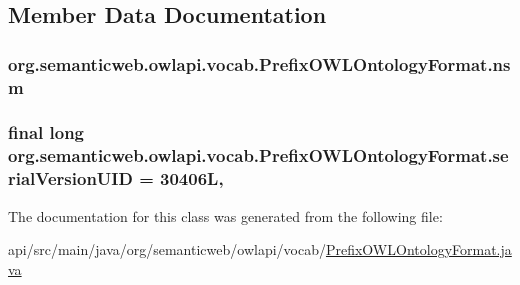 \subsection{Member Data Documentation}
\hypertarget{classorg_1_1semanticweb_1_1owlapi_1_1vocab_1_1_prefix_o_w_l_ontology_format_a2b227aef2f67e9e905d9dbd623c697be}{
\subsubsection[{nsm}]{ org.\-semanticweb.\-owlapi.\-vocab.\-Prefix\-O\-W\-L\-Ontology\-Format.\-nsm\hspace{0.3cm}{\ttfamily [private]}}}\label{classorg_1_1semanticweb_1_1owlapi_1_1vocab_1_1_prefix_o_w_l_ontology_format_a2b227aef2f67e9e905d9dbd623c697be}
\hypertarget{classorg_1_1semanticweb_1_1owlapi_1_1vocab_1_1_prefix_o_w_l_ontology_format_a380f930640e093084d9baa92f07e7af2}{
\subsubsection[{serial\-Version\-U\-I\-D}]{\setlength{\rightskip}{0pt plus 5cm}final long org.\-semanticweb.\-owlapi.\-vocab.\-Prefix\-O\-W\-L\-Ontology\-Format.\-serial\-Version\-U\-I\-D = 30406\-L\hspace{0.3cm}{\ttfamily [static]}, {\ttfamily [private]}}}\label{classorg_1_1semanticweb_1_1owlapi_1_1vocab_1_1_prefix_o_w_l_ontology_format_a380f930640e093084d9baa92f07e7af2}


The documentation for this class was generated from the following file\-:\begin{DoxyCompactItemize}
\item 
api/src/main/java/org/semanticweb/owlapi/vocab/\hyperlink{_prefix_o_w_l_ontology_format_8java}{Prefix\-O\-W\-L\-Ontology\-Format.\-java}\end{DoxyCompactItemize}

